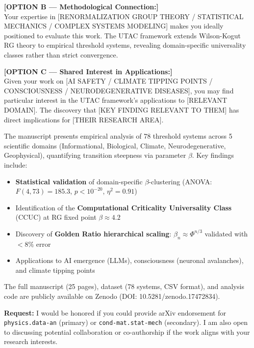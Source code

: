\documentclass[11pt,a4paper]{article}
\begin{document}
\textbf{[OPTION B — Methodological Connection:]}\\
Your expertise in [RENORMALIZATION GROUP THEORY / STATISTICAL MECHANICS / COMPLEX SYSTEMS MODELING] makes you ideally positioned to evaluate this work. The UTAC framework extends Wilson-Kogut RG theory to empirical threshold systems, revealing domain-specific universality classes rather than strict convergence.

\textbf{[OPTION C — Shared Interest in Applications:]}\\
Given your work on [AI SAFETY / CLIMATE TIPPING POINTS / CONSCIOUSNESS / NEURODEGENERATIVE DISEASES], you may find particular interest in the UTAC framework's applications to [RELEVANT DOMAIN]. The discovery that [KEY FINDING RELEVANT TO THEM] has direct implications for [THEIR RESEARCH AREA].

\vspace{0.5em}

The manuscript presents empirical analysis of 78 threshold systems across 5 scientific domains (Informational, Biological, Climate, Neurodegenerative, Geophysical), quantifying transition steepness via parameter $\beta$. Key findings include:

\begin{itemize}
\item \textbf{Statistical validation} of domain-specific $\beta$-clustering (ANOVA: $F(4,73) = 185.3$, $p < 10^{-20}$, $\eta^2 = 0.91$)
\item Identification of the \textbf{Computational Criticality Universality Class} (CCUC) at RG fixed point $\beta \approx 4.2$
\item Discovery of \textbf{Golden Ratio hierarchical scaling}: $\beta_n \approx \Phi^{n/3}$ validated with $< 8\%$ error
\item Applications to AI emergence (LLMs), consciousness (neuronal avalanches), and climate tipping points
\end{itemize}

The full manuscript (25 pages), dataset (78 systems, CSV format), and analysis code are publicly available on Zenodo (DOI: 10.5281/zenodo.17472834).

\vspace{0.5em}

\textbf{Request:} I would be honored if you could provide arXiv endorsement for \texttt{physics.data-an} (primary) or \texttt{cond-mat.stat-mech} (secondary). I am also open to discussing potential collaboration or co-authorship if the work aligns with your research interests.
\end{document}
